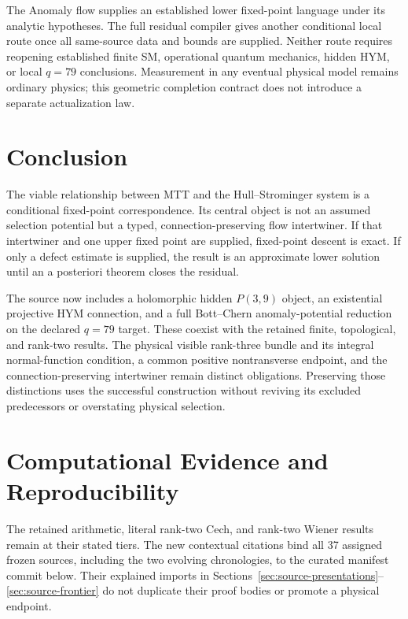 \documentclass[11pt]{article}
\theoremstyle{definition}
\theoremstyle{remark}
\begin{document}
The Anomaly flow supplies an established lower fixed-point language under
its analytic hypotheses.  The full residual compiler gives another
conditional local route once all same-source data and bounds are supplied.
Neither route requires reopening established finite SM, operational quantum
mechanics, hidden HYM, or local \(q=79\) conclusions.  Measurement in any
eventual physical model remains ordinary physics; this geometric completion
contract does not introduce a separate actualization law.

\section{Conclusion}

The viable relationship between MTT and the Hull--Strominger system is a
conditional fixed-point correspondence.  Its central object is not an
assumed selection potential but a typed, connection-preserving flow
intertwiner.  If that intertwiner and one upper fixed point are supplied,
fixed-point descent is exact.  If only a defect estimate is supplied, the
result is an approximate lower solution until an a posteriori theorem closes
the residual.

The source now includes a holomorphic hidden \(P(3,9)\) object, an
existential projective HYM connection, and a full Bott--Chern anomaly-potential
reduction on the declared \(q=79\) target.  These coexist with the retained
finite, topological, and rank-two results.  The physical visible rank-three
bundle and its integral normal-function condition, a common positive
nontransverse endpoint, and the connection-preserving intertwiner remain
distinct obligations.  Preserving those distinctions uses the successful
construction without reviving its excluded predecessors or overstating
physical selection.





\section*{Computational Evidence and Reproducibility}
\label{sec:reproducibility}
The retained arithmetic, literal rank-two Cech, and rank-two Wiener results
remain at their stated tiers.  The new contextual citations bind all 37
assigned frozen sources, including the two evolving chronologies, to the
curated manifest commit below.  Their explained imports in
Sections~\ref{sec:source-presentations}--\ref{sec:source-frontier} do not
duplicate their proof bodies or promote a physical endpoint.
\end{document}
